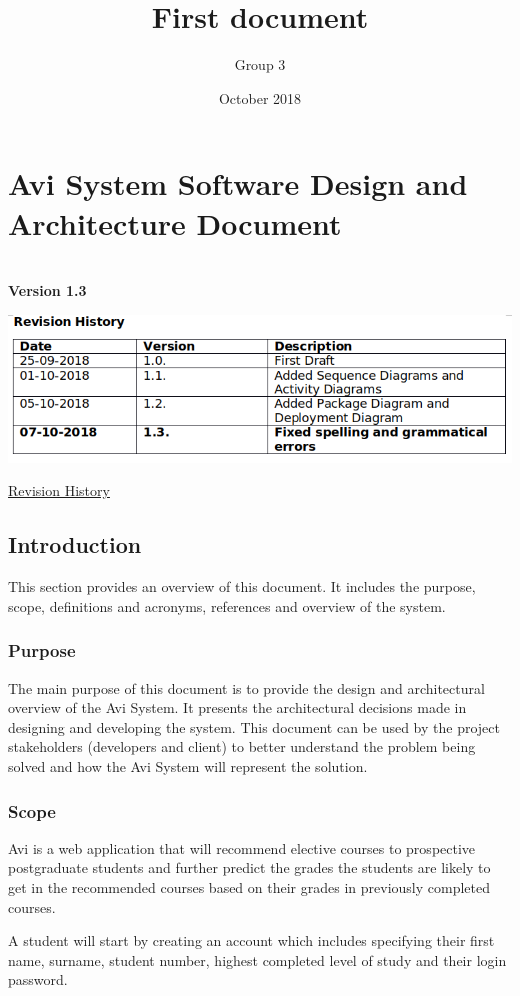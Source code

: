 \documentclass[10pt]{article}
\title{First document}
\author{Group 3}
\date{October 2018}
\begin{document}
\section{Avi System Software Design and Architecture Document} \\

\textbf{Version 1.3} \\

\begin{center}
\includegraphics[width=.9\textwidth]{revision_history.png}
\end{center}
\caption{\underline{Revision History}}

\subsection{Introduction}

This section provides an overview of this document. It includes the purpose, scope, definitions and acronyms, references and overview of the system.

\subsubsection{Purpose}

The main purpose of this document is to provide the design and architectural overview of the Avi System. It presents the architectural decisions made in designing and developing the system. This document can be used by the project stakeholders (developers and client) to better understand the problem being solved and how the Avi System will represent the solution.

\subsubsection{Scope}

Avi is a web application that will recommend elective courses to prospective postgraduate students and further predict the grades the students are likely to get in the recommended courses based on their grades in previously completed courses.

A student will start by creating an account which includes specifying their first name, surname, student number, highest completed level of study and their login password.
\end{document}
